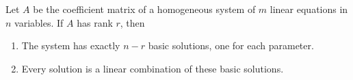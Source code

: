 \documentclass[20pt,a4paper]{extarticle}
\newcounter{theorem}
\begin{document}
\begin{theorem}
Let $A$ be the coefficient matrix of a homogeneous system of $m$ linear equations in $n$ variables. If $A$ has rank $r$, then
	\begin{enumerate}[label=\arabic*.]
	\item The system has exactly $n - r$ basic solutions, one for each parameter.
	\item Every solution is a linear combination of these basic solutions.
\end{enumerate}
\end{theorem}
\end{document}
